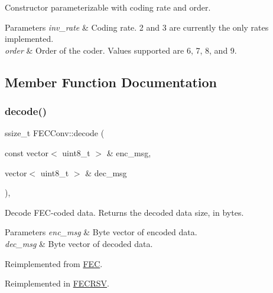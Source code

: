 Constructor parameterizable with coding rate and order. 
\begin{DoxyParams}{Parameters}
{\em inv\+\_\+rate} & Coding rate. 2 and 3 are currently the only rates implemented. \\
\hline
{\em order} & Order of the coder. Values supported are 6, 7, 8, and 9. \\
\hline
\end{DoxyParams}


\subsection{Member Function Documentation}
\mbox{\label{classFECConv_afd897d6756bbbe4874942654e91a95e3}} 
\subsubsection{\texorpdfstring{decode()}{decode()}}
{\footnotesize\ttfamily ssize\+\_\+t F\+E\+C\+Conv\+::decode (\begin{DoxyParamCaption}\item[{const vector$<$ uint8\+\_\+t $>$ \&}]{enc\+\_\+msg,  }\item[{vector$<$ uint8\+\_\+t $>$ \&}]{dec\+\_\+msg }\end{DoxyParamCaption})\hspace{0.3cm}{\ttfamily [inline]}, {\ttfamily [virtual]}}

Decode F\+E\+C-\/coded data. Returns the decoded data size, in bytes. 
\begin{DoxyParams}{Parameters}
{\em enc\+\_\+msg} & Byte vector of encoded data. \\
\hline
{\em dec\+\_\+msg} & Byte vector of decoded data. \\
\hline
\end{DoxyParams}


Reimplemented from \hyperlink{classFEC_aec87f2d9c2305283d226197bf76891cf}{F\+EC}.



Reimplemented in \hyperlink{classFECRSV_a4781900bd59579d7a380687c59179ae5}{F\+E\+C\+R\+SV}.

\mbox{\label{classFECConv_ae3e796d0e026dca718ed6384653a4564}} 
